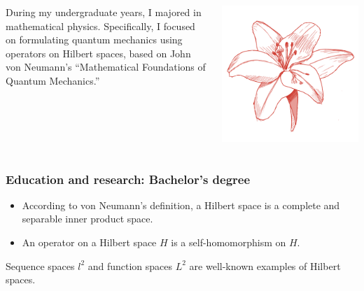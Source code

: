 \documentclass[dvipdfmx,11pt,notheorems]{beamer}
\begin{document}
\begin{frame}
  \begin{columns}[c]
    \begin{column}{0.6\textwidth}
      During my undergraduate years, I majored in mathematical physics. Specifically, I focused on formulating quantum mechanics using operators on Hilbert spaces, based on John von Neumann's ``Mathematical Foundations of Quantum Mechanics.''
    \end{column}
    \begin{column}{0.4\textwidth}
      \begin{center}
        \includegraphics[width=0.8\columnwidth]{global_okmtyuta.png}
      \end{center}
    \end{column}
  \end{columns}
\end{frame}

\begin{frame}\frametitle{Education and research: Bachelor's degree}
  \begin{dfn}
    \begin{itemize}
      \item According to von Neumann's definition, a Hilbert space is a complete and separable inner product space.
      \item An operator on a Hilbert space $H$ is a self-homomorphism on $H$.
    \end{itemize}
  \end{dfn}

  \begin{eg}
    Sequence spaces $l^2$ and function spaces $L^2$ are well-known examples of Hilbert spaces.
  \end{eg}
\end{frame}
\end{document}
